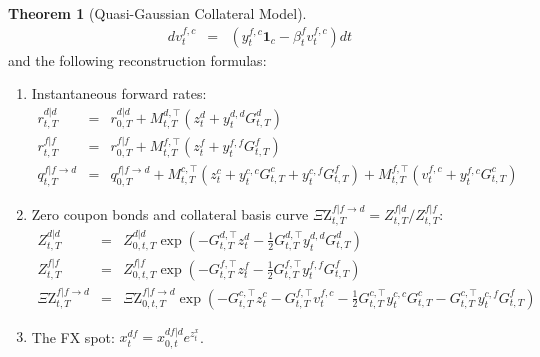 \documentclass[11pt,english]{amsart}
\newcommand{\vun}{\mathbf{1}}
\newcommand{\QZ}{{\Xi\mathrm{Z}}}
\theoremstyle{definition}
\newtheorem{theo}{Theorem}
\begin{document}
\begin{theo}[Quasi-Gaussian Collateral Model]
\begin{eqnarray}
  dv^{f,c}_t &=&   \left( y^{f,c}_{t}\vun_c - \beta^{f}_{t} v^{f,c}_t\right) dt
\end{eqnarray}
and the following reconstruction formulas:
\begin{enumerate}
\item Instantaneous forward rates:
\begin{eqnarray}
  r^{d|d}_{t,T} &=& r^{d|d}_{0,T} + M^{d,\top}_{t,T}\left( z^{d}_t + y^{d,d}_t G^{d}_{t,T} \right) \\
  r^{f|f}_{t,T} &=& r^{f|f}_{0,T} + M^{f,\top}_{t,T}\left( z^{f}_t + y^{f,f}_t G^{f}_{t,T} \right) \\
  q^{f|f\to d}_{t,T} &=& q^{f|f\to d}_{0,T} +  M^{c,\top}_{t,T}\left( z^{c}_t + y^{c,c}_t G^{c}_{t,T} + y^{c,f}_t G^{f}_{t,T} \right) +  M^{f,\top}_{t,T}\left( v^{f,c}_t + y^{f,c}_t G^{c}_{t,T} \right)
\end{eqnarray}
\item Zero coupon bonds and collateral basis curve $\QZ^{f|f\to d}_{t,T} = Z^{f|d}_{t,T}/Z^{f|f}_{t,T}$:
\begin{eqnarray}
  Z^{d|d}_{t,T} &=& Z^{d|d}_{0,t,T} \exp\left( -G^{d,\top}_{t,T} z^{d}_t -\frac{1}{2} G^{d,\top}_{t,T}  y^{d,d}_t G^{d}_{t,T} \right)  \\
  Z^{f|f}_{t,T} &=& Z^{f|f}_{0,t,T} \exp\left( -G^{f,\top}_{t,T} z^{f}_t -\frac{1}{2} G^{f,\top}_{t,T}  y^{f,f}_t G^{f}_{t,T} \right)  \\
  \QZ^{f|f\to d}_{t,T} &=& \QZ^{f|f\to d}_{0,t,T} \exp\left( -G^{c,\top}_{t,T} z^{c}_t - G^{f,\top}_{t,T} v^{f,c}_t - \frac{1}{2} G^{c,\top}_{t,T}  y^{c,c}_t G^{c}_{t,T} - G^{c,\top}_{t,T}  y^{c,f}_t G^{f}_{t,T}  \right)
  \label{eq:qgcm_collateral_basis_reconstruction}
\end{eqnarray}
\item The FX spot: $x^{df}_{t} = x^{df|d}_{0,t} e^{z^{x}_t}$.
\end{enumerate}
\end{theo}
\end{document}
